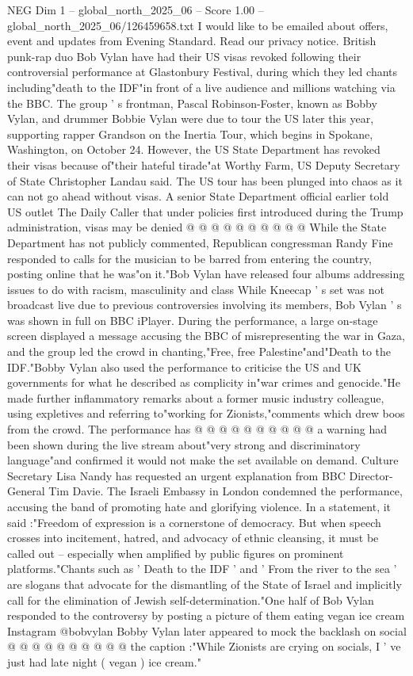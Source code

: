 \begin{textsample}{NEG Dim 1 – global\_north\_2025\_06 – Score 1.00 – global\_north\_2025\_06/126459658.txt}  \label{ex:f1_neg_124}
I would like to be emailed about offers, event and updates from Evening Standard.
Read our privacy notice.
British punk-rap duo Bob Vylan have had their US visas revoked following their controversial performance at Glastonbury Festival, during which they led chants including"death to the IDF"in front of a live audience and millions watching via the BBC.
The group ' s frontman, Pascal Robinson-Foster, known as Bobby Vylan, and drummer Bobbie Vylan were due to tour the US later this year, supporting rapper Grandson on the Inertia Tour, which begins in Spokane, Washington, on October 24.
However, the US State Department has revoked their visas because of"their hateful tirade"at Worthy Farm, US Deputy Secretary of State Christopher Landau said.
The US tour has been plunged into chaos as it can not go ahead without visas.
A senior State Department official earlier told US outlet The Daily Caller that under policies first introduced during the Trump administration, visas may be denied @ @ @ @ @ @ @ @ @ @ While the State Department has not publicly commented, Republican congressman Randy Fine responded to calls for the musician to be barred from entering the country, posting online that he was"on it."Bob Vylan have released four albums addressing issues to do with racism, masculinity and class While Kneecap ' s set was not broadcast live due to previous controversies involving its members, Bob Vylan ' s was shown in full on BBC iPlayer.
During the performance, a large on-stage screen displayed a message accusing the BBC of misrepresenting the war in Gaza, and the group led the crowd in chanting,"Free, free Palestine"and"Death to the IDF."Bobby Vylan also used the performance to criticise the US and UK governments for what he described as complicity in"war crimes and genocide."He made further inflammatory remarks about a former music industry colleague, using expletives and referring to"working for Zionists,"comments which drew boos from the crowd.
The performance has @ @ @ @ @ @ @ @ @ @ a warning had been shown during the live stream about"very strong and discriminatory language"and confirmed it would not make the set available on demand.
Culture Secretary Lisa Nandy has requested an urgent explanation from BBC Director-General Tim Davie.
The Israeli Embassy in London condemned the performance, accusing the band of promoting hate and glorifying violence.
In a statement, it said :"Freedom of expression is a cornerstone of democracy.
But when speech crosses into incitement, hatred, and advocacy of ethnic cleansing, it must be called out -- especially when amplified by public figures on prominent platforms."Chants such as ' Death to the IDF ' and ' From the river to the sea ' are slogans that advocate for the dismantling of the State of Israel and implicitly call for the elimination of Jewish self-determination."One half of Bob Vylan responded to the controversy by posting a picture of them eating vegan ice cream Instagram @bobvylan Bobby Vylan later appeared to mock the backlash on social @ @ @ @ @ @ @ @ @ @ the caption :"While Zionists are crying on socials, I ' ve just had late night ( vegan ) ice cream."

\end{textsample}
